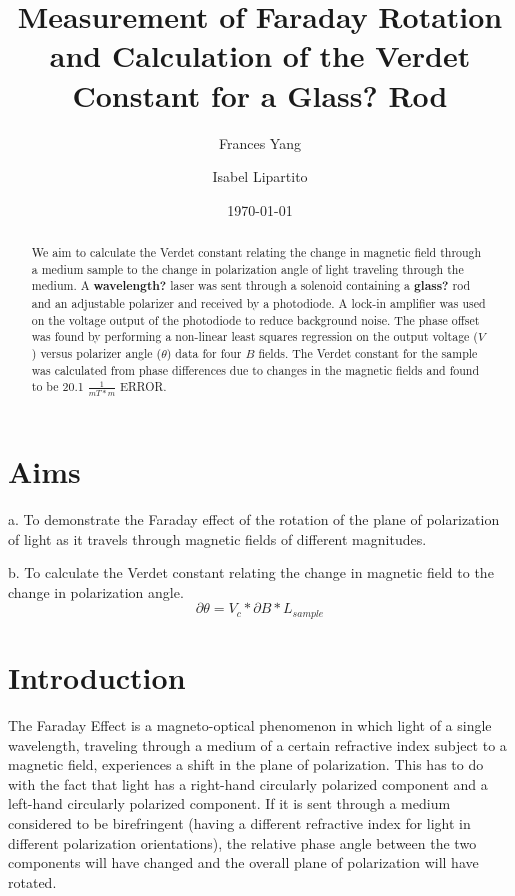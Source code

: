 \documentclass[prb,preprint]{revtex4-1}
\begin{document}
\title{Measurement of Faraday Rotation and Calculation of the Verdet Constant for a Glass? Rod}

\author{Frances Yang}

\author{Isabel Lipartito}

\date{\today}

\begin{abstract}
We aim to calculate the Verdet constant relating the change in magnetic field through a medium sample to the change in polarization angle of light traveling through the medium.  A {\bf wavelength?} laser was sent through a solenoid containing a {\bf glass?} rod and an adjustable polarizer and received by a photodiode. A lock-in amplifier was used on the voltage output of the photodiode to reduce background noise. The phase offset was found by performing a non-linear least squares regression on the output voltage ($V$) versus polarizer angle ($\theta$) data for four $B$ fields. The Verdet constant for the sample was calculated from phase differences due to changes in the magnetic fields and found to be 20.1 $\frac{1}{mT*m}$ ERROR. 
\end{abstract}

\maketitle 
\section{Aims}
a.  To demonstrate the Faraday effect of the rotation of the plane of polarization of light as it travels through magnetic fields of different magnitudes.

b.  To calculate the Verdet constant relating the change in magnetic field to the change in polarization angle.
\begin{equation}
\partial \theta =V_{c}*\partial B*L{_{sample}}
\end{equation}

\section{Introduction} 

{The Faraday Effect is a magneto-optical phenomenon in which light of a single wavelength, traveling through a medium of a certain refractive index subject to a magnetic field, experiences a shift in the plane of polarization.  This has to do with the fact that light has a right-hand circularly polarized component and a left-hand circularly polarized component.  If it is sent through a medium considered to be birefringent (having a different refractive index for light in different polarization orientations), the relative phase angle between the two components will have changed and the overall plane of polarization will have rotated.}
\end{document}

